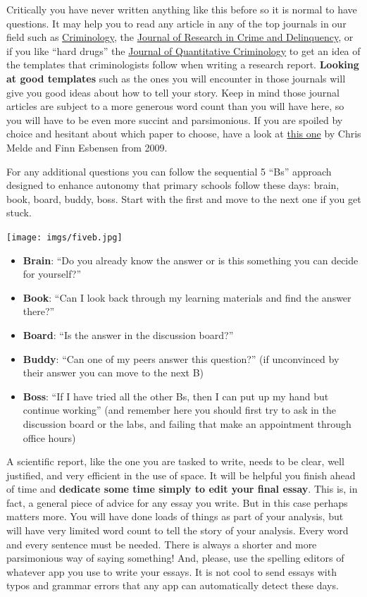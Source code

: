 \documentclass[
]{book}
\providecommand{\tightlist}{%
  \setlength{\itemsep}{0pt}\setlength{\parskip}{0pt}}
\begin{document}
Critically you have never written anything like this before so it is normal to have questions. It may help you to read any article in any of the top journals in our field such as \href{https://onlinelibrary.wiley.com/journal/17459125}{Criminology}, the \href{https://journals.sagepub.com/home/jrc}{Journal of Research in Crime and Delinquency}, or if you like ``hard drugs'' the \href{https://link.springer.com/journal/10940}{Journal of Quantitative Criminology} to get an idea of the templates that criminologists follow when writing a research report. \textbf{Looking at good templates} such as the ones you will encounter in those journals will give you good ideas about how to tell your story. Keep in mind those journal articles are subject to a more generous word count than you will have here, so you will have to be even more succint and parsimonious. If you are spoiled by choice and hesitant about which paper to choose, have a look at \href{https://onlinelibrary.wiley.com/doi/10.1111/j.1745-9125.2011.00227.x}{this one} by Chris Melde and Finn Esbensen from 2009.

For any additional questions you can follow the sequential 5 ``Bs'' approach designed to enhance autonomy that primary schools follow these days: brain, book, board, buddy, boss. Start with the first and move to the next one if you get stuck.

\texttt{[image: imgs/fiveb.jpg]}

\begin{itemize}
\tightlist
\item
  \textbf{Brain}: ``Do you already know the answer or is this something you can decide for yourself?''
\item
  \textbf{Book}: ``Can I look back through my learning materials and find the answer there?''
\item
  \textbf{Board}: ``Is the answer in the discussion board?''
\item
  \textbf{Buddy}: ``Can one of my peers answer this question?'' (if unconvinced by their answer you can move to the next B)
\item
  \textbf{Boss}: ``If I have tried all the other Bs, then I can put up my hand but continue working'' (and remember here you should first try to ask in the discussion board or the labs, and failing that make an appointment through office hours)
\end{itemize}

A scientific report, like the one you are tasked to write, needs to be clear, well justified, and very efficient in the use of space. It will be helpful you finish ahead of time and \textbf{dedicate some time simply to edit your final essay}. This is, in fact, a general piece of advice for any essay you write. But in this case perhaps matters more. You will have done loads of things as part of your analysis, but will have very limited word count to tell the story of your analysis. Every word and every sentence must be needed. There is always a shorter and more parsimonious way of saying something! And, please, use the spelling editors of whatever app you use to write your essays. It is not cool to send essays with typos and grammar errors that any app can automatically detect these days.
\end{document}
